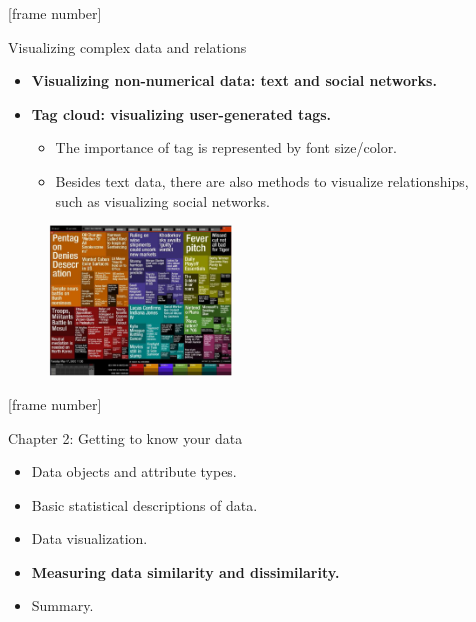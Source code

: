 \documentclass[aspectratio=169,t]{beamer}
\begin{document}
  {
    [frame number]
    \begin{frame}{Visualizing complex data and relations}
    \centering
    \begin{itemize}
      \item \textbf{Visualizing non-numerical data: text and social networks.}
      \item \textbf{Tag cloud: visualizing user-generated tags.}
      \begin{itemize}
        \item The importance of tag is represented by font size/color.
        \item Besides text data, there are also methods to visualize relationships, \\ such as visualizing social networks.
      \end{itemize}
    \end{itemize}
    \includegraphics[width=7cm,height=4cm]{img/google_news.png}
    \end{frame}
  }

  {
    [frame number]
    \begin{frame}{Chapter 2: Getting to know your data}
    \centering
    \begin{itemize}
        \item Data objects and attribute types.
        \item Basic statistical descriptions of data.
        \item Data visualization.
        \item \textbf{Measuring data similarity and dissimilarity.}
        \item Summary.
    \end{itemize}
    \end{frame}
  }
\end{document}

